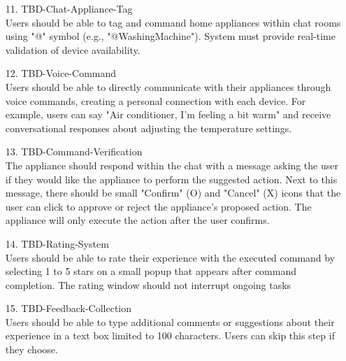 \documentclass[conference]{IEEEtran}
\begin{document}
\begin{enumerate}
\begin{itemize}
\begin{itemize}
    \begin{enumerate}
        \item[11.] TBD-Chat-Appliance-Tag \\
                Users should be able to tag and command home appliances within chat rooms using "@" symbol (e.g., "@WashingMachine"). System must provide real-time validation of device availability. \\
    \end{enumerate}

    \begin{enumerate}
        \item[12.] TBD-Voice-Command \\
                Users should be able to directly communicate with their appliances through voice commands, creating a personal connection with each device. For example, users can say "Air conditioner, I'm feeling a bit warm" and receive conversational responses about adjusting the temperature settings. \\
    \end{enumerate}

    \begin{enumerate}
        \item[13.] TBD-Command-Verification \\
                The appliance should respond within the chat with a message asking the user if they would like the appliance to perform the suggested action. Next to this message, there should be small "Confirm" (O) and "Cancel" (X) icons that the user can click to approve or reject the appliance's proposed action. The appliance will only execute the action after the user confirms. \\
    \end{enumerate}

    \begin{enumerate}
        \item[14.] TBD-Rating-System \\
                Users should be able to rate their experience with the executed command by selecting 1 to 5 stars on a small popup that appears after command completion. The rating window should not interrupt ongoing tasks \\
    \end{enumerate}

    \begin{enumerate}
        \item[15.] TBD-Feedback-Collection \\
                Users should be able to type additional comments or suggestions about their experience in a text box limited to 100 characters. Users can skip this step if they choose. \\
    \end{enumerate}


\end{itemize}
\end{itemize}
\end{enumerate}
\end{document}
